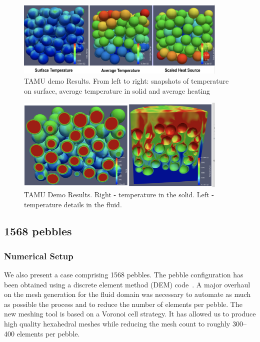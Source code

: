 \begin{figure}[!h]
\centering
\includegraphics[clip=true,width=0.9\textwidth]{Figures/demo_r1}
\caption{TAMU demo Results. From left to right: snapshots of temperature on surface, average temperature in solid and average heating}
\label{f:dtamu1}
\end{figure}

\begin{figure}[!h]
\centering
\includegraphics[clip=true,width=0.9\textwidth]{Figures/demo_r2}
\caption{TAMU Demo Results. Right - temperature in the solid. Left - temperature details in the fluid.}
\label{f:dtamu2}
\end{figure}

\subsection{1568 pebbles}

\subsubsection{Numerical Setup}

We also present a case comprising 1568 pebbles. The pebble configuration has
been obtained using a discrete element method (DEM) code~\cite{projectChronoWebSite}.
A major overhaul on the mesh generation for the fluid domain was necessary
to automate as much as possible the process and to reduce the number of elements
per pebble. The new meshing tool is based on a Voronoi cell strategy.
It has allowed us to produce high quality hexahedral meshes while reducing the mesh
count to roughly 300--400 elements per pebble.

